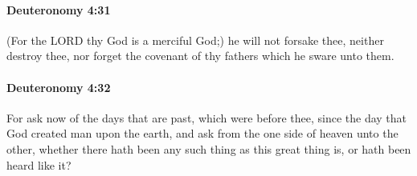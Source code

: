 		\paragraph{Deuteronomy 4:31} %
			\label{DEUTERONOMY-4-31}

			(For the LORD thy God is a merciful God;) he will not forsake thee, neither destroy thee, nor forget the covenant of thy fathers which he sware unto them.


		\paragraph{Deuteronomy 4:32} %
			\label{DEUTERONOMY-4-32}

			For ask now of the days that are past, which were before thee, since the day that God created man upon the earth, and ask from the one side of heaven unto the other, whether there hath been any such thing as this great thing is, or hath been heard like it?

